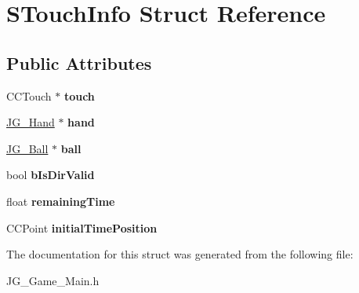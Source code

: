 \hypertarget{struct_s_touch_info}{\section{S\-Touch\-Info Struct Reference}
\label{struct_s_touch_info}
}
\subsection*{Public Attributes}
\begin{DoxyCompactItemize}
\item 
\hypertarget{struct_s_touch_info_a476c6db5c7f5ee0987fef6221fbceaf7}{C\-C\-Touch $\ast$ {\bfseries touch}}\label{struct_s_touch_info_a476c6db5c7f5ee0987fef6221fbceaf7}

\item 
\hypertarget{struct_s_touch_info_a354b68630606341541b282561bb4c292}{\hyperlink{class_j_g___hand}{J\-G\-\_\-\-Hand} $\ast$ {\bfseries hand}}\label{struct_s_touch_info_a354b68630606341541b282561bb4c292}

\item 
\hypertarget{struct_s_touch_info_aaed3c79798657884c11efa8a0e1fcb3f}{\hyperlink{class_j_g___ball}{J\-G\-\_\-\-Ball} $\ast$ {\bfseries ball}}\label{struct_s_touch_info_aaed3c79798657884c11efa8a0e1fcb3f}

\item 
\hypertarget{struct_s_touch_info_ab444619d360b1742837805506f9e1779}{bool {\bfseries b\-Is\-Dir\-Valid}}\label{struct_s_touch_info_ab444619d360b1742837805506f9e1779}

\item 
\hypertarget{struct_s_touch_info_a76f5cc268d81a4d3c80884669c7cc050}{float {\bfseries remaining\-Time}}\label{struct_s_touch_info_a76f5cc268d81a4d3c80884669c7cc050}

\item 
\hypertarget{struct_s_touch_info_ae1dd747adb4a406c03f18b5ffa45df6a}{C\-C\-Point {\bfseries initial\-Time\-Position}}\label{struct_s_touch_info_ae1dd747adb4a406c03f18b5ffa45df6a}

\end{DoxyCompactItemize}


The documentation for this struct was generated from the following file\-:\begin{DoxyCompactItemize}
\item 
J\-G\-\_\-\-Game\-\_\-\-Main.\-h\end{DoxyCompactItemize}
